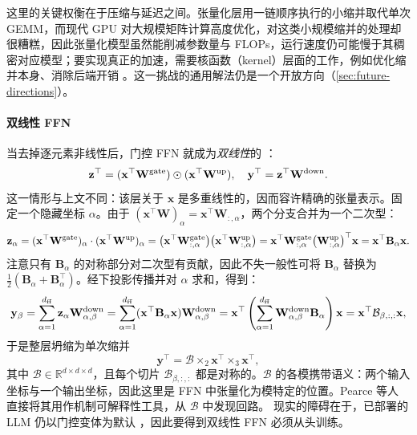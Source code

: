 \documentclass[11pt]{article}
\newcommand{\R}{\mathbb{R}}
\newcommand{\ten}[1]{\mathcal{#1}}
\newcommand{\mat}[1]{\mathbf{#1}}
\newcommand{\vecb}[1]{\mathbf{#1}}
\begin{document}
这里的关键权衡在于压缩与延迟之间。张量化层用一链顺序执行的小缩并取代单次 GEMM，而现代 GPU 对大规模矩阵计算高度优化，对这类小规模缩并的处理却很糟糕，因此张量化模型虽然能削减参数量与 FLOPs，运行速度仍可能慢于其稠密对应模型；要实现真正的加速，需要核函数（kernel）层面的工作，例如优化缩并本身、消除后端开销 \cite{yang2024comera}。这一挑战的通用解法仍是一个开放方向（\cref{sec:future-directions}）。



\paragraph{双线性 FFN}

当去掉逐元素非线性后，门控 FFN 就成为\emph{双线性}的 \cite{shazeer2020glu}：
\begin{equation}
    \vecb{z}^\top = (\vecb{x}^\top \mat{W}^{\rm gate}) \odot ( \vecb{x}^\top \mat{W}^{\rm up}), \quad \vecb{y}^\top = \vecb{z}^\top \mat{W}^{\rm down}.
\end{equation}
这一情形与上文不同：该层关于 $\vecb{x}$ 是多重线性的，因而容许精确的张量表示。固定一个隐藏坐标 $\alpha$。由于 $(\vecb{x}^\top \mat{W})_\alpha = \vecb{x}^\top \mat{W}_{:, \alpha}$，两个分支合并为一个二次型：
\begin{equation}
  \vecb{z}_\alpha = (\vecb{x}^\top \mat{W}^{\rm gate})_\alpha \cdot (\vecb{x}^\top \mat{W}^{\rm up})_\alpha = \bigl(\vecb{x}^\top \mat{W}^{\rm gate}_{:, \alpha}\bigr)\bigl(\vecb{x}^\top \mat{W}^{\rm up}_{:, \alpha}\bigr) = \vecb{x}^\top \mat{W}^{\rm gate}_{:, \alpha} \bigl(\mat{W}^{\rm up}_{:, \alpha}\bigr)^\top \vecb{x} = \vecb{x}^\top \mat{B}_{\alpha} \vecb{x}.
\end{equation}
注意只有 $\mat{B}_\alpha$ 的对称部分对二次型有贡献，因此不失一般性可将 $\mat{B}_\alpha$ 替换为 $\tfrac{1}{2}(\mat{B}_\alpha + \mat{B}_\alpha^\top)$。经下投影传播并对 $\alpha$ 求和，得到：
\begin{equation}
  \vecb{y}_\beta = \sum_{\alpha=1}^{d_{\rm ff}} \vecb{z}_\alpha \mat{W}^{\rm down}_{\alpha, \beta} = \sum_{\alpha=1}^{d_{\rm ff}} (\vecb{x}^\top \mat{B}_{\alpha} \vecb{x}) \mat{W}^{\rm down}_{\alpha, \beta} = \vecb{x}^\top \left( \sum_{\alpha=1}^{d_{\rm ff}} \mat{W}^{\rm down}_{\alpha, \beta} \mat{B}_{\alpha} \right) \vecb{x} = \vecb{x}^\top \ten{B}_{\beta, :, :} \vecb{x},
\end{equation}
于是整层坍缩为单次缩并
\begin{equation}
\label{eq:bilinear-forward-pass}
  \vecb{y}^\top = \ten{B} \times_2 \vecb{x}^\top \times_3 \vecb{x}^\top,
\end{equation}
其中 $\ten{B} \in \R^{d \times d \times d}$，且每个切片 $\ten{B}_{\beta, :, :}$ 都是对称的。$\ten{B}$ 的各模携带语义：两个输入坐标与一个输出坐标，因此这里是 FFN 中张量化为模特定的位置。Pearce 等人 \cite{pearce2025bilinearmlp} 直接将其用作机制可解释性工具，从 $\ten{B}$ 中发现回路。
现实的障碍在于，已部署的 LLM 仍以门控变体为默认 \cite{shazeer2020glu}，因此要得到双线性 FFN 必须从头训练。
\end{document}
